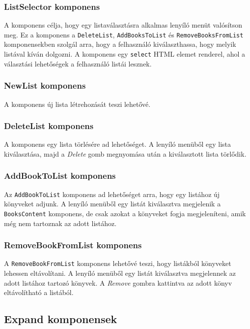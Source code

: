 \subsubsection{ListSelector komponens}

A komponens célja, hogy egy listaválasztásra alkalmas lenyíló menüt valósítson meg. Ez a komponens a \texttt{DeleteList}, \texttt{AddBooksToList} és \texttt{RemoveBooksFromList} komponensekben szolgál arra, hogy a felhasználó kiválaszthassa, hogy melyik listával kíván dolgozni. A komponens egy \texttt{select} HTML elemet renderel, ahol a választási lehetőségek a felhasználó listái lesznek.

\subsubsection{NewList komponens}

A komponens új lista létrehozását teszi lehetővé.

\subsubsection{DeleteList komponens}

A komponens egy lista törlésére ad lehetőséget. A lenyíló menüből egy lista kiválasztása, majd a \textit{Delete} gomb megnyomása után a kiválasztott lista törlődik.

\subsubsection{AddBookToList komponens}

Az \texttt{AddBookToList} komponens ad lehetőséget arra, hogy egy listához új könyveket adjunk. A lenyíló menüből egy listát kiválasztva megjelenik a \texttt{BooksContent} komponens, de csak azokat a könyveket fogja megjeleníteni, amik még nem tartoznak az adott listához.

\subsubsection{RemoveBookFromList komponens}

A \texttt{RemoveBookFromList} komponens lehetővé teszi, hogy listákból könyveket lehessen eltávolítani. A lenyíló menüből egy listát kiválasztva megjelennek az adott listához tartozó könyvek. A \textit{Remove} gombra kattintva az adott könyv eltávolítható a listából.

\subsection{Expand komponensek}

